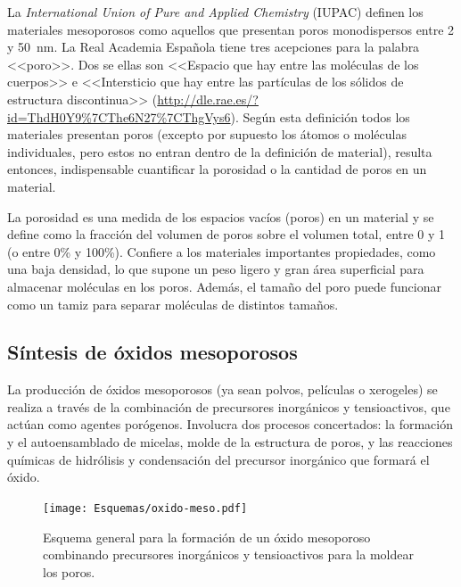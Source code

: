 	 La \textit{International Union of Pure and Applied Chemistry} (IUPAC) definen los materiales mesoporosos como aquellos que presentan poros monodispersos entre 2 y \SI{50}{\nm}. La Real Academia Española tiene tres acepciones para la palabra <<poro>>. Dos se ellas son <<Espacio que hay entre las moléculas de los cuerpos>> e <<Intersticio que hay entre las partículas de los sólidos de estructura discontinua>> (\url{http://dle.rae.es/?id=ThdH0Y9%7CThe6N27%7CThgVys6}). Según esta definición todos los materiales presentan poros (excepto por supuesto los átomos o moléculas individuales, pero estos no entran dentro de la definición de material), resulta entonces, indispensable cuantificar la porosidad o la cantidad de poros en un material.

	 \pagebreak La porosidad es una medida de los espacios vacíos (poros) en un material y se define como la fracción del volumen de poros sobre el volumen total, entre 0 y 1 (o entre 0\% y 100\%).\cite{iupac-1994} Confiere a los materiales importantes propiedades, como una baja densidad, lo que supone un peso ligero y gran área superficial para almacenar moléculas en los poros. Además, el tamaño del poro puede funcionar como un tamiz para separar moléculas de distintos tamaños.\cite{Martin2004} 

	\subsection{Síntesis de óxidos mesoporosos} 

	 La producción de óxidos mesoporosos (ya sean polvos, películas o xerogeles) se realiza a través de la combinación de precursores inorgánicos y tensioactivos, que actúan como agentes porógenos. Involucra dos procesos concertados: la formación y el autoensamblado de micelas, molde de la estructura de poros, y las reacciones químicas de hidrólisis y condensación del precursor inorgánico que formará el óxido. 

				\begin{figure}[h!]
 				\begin{center}
 				\texttt{[image: Esquemas/oxido-meso.pdf]}
 				\caption[Esquema general para la formación de un óxido mesoestructurado]{Esquema general para la formación de un óxido mesoporoso combinando precursores inorgánicos y tensioactivos para la moldear los poros.}
 		   		\label{fig:oxmeso}
 		    	\end{center}
 		    	\end{figure}

